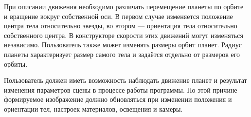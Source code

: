 \documentclass[ordinary]{BMSTU-IU8}
\begin{document}
При описании движения необходимо различать перемещение планеты по орбите
и вращение вокруг собственной оси. В первом случае изменяется положение
центра тела относительно звезды, во втором --- ориентация тела относительно
собственного центра. В конструкторе скорости этих движений могут
изменяться независимо. Пользователь также может изменять размеры орбит
планет. Радиус планеты характеризует размер самого тела
и задаётся отдельно от размеров его орбиты.

Пользователь должен иметь возможность наблюдать движение планет и результат
изменения параметров сцены в процессе работы программы. По этой причине формируемое
изображение должно обновляться при изменении положения и ориентации тел,
настроек материалов, освещения и камеры.

\printbibliography
\end{document}
